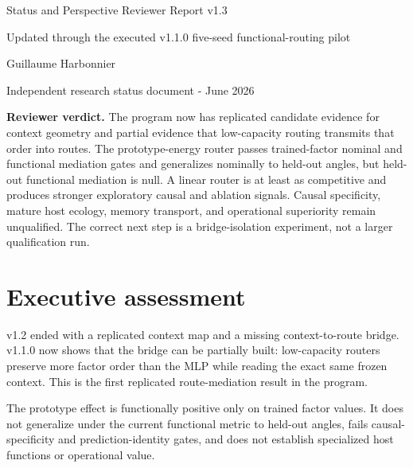 \documentclass[11pt,a4paper]{article}
\begin{document}
\begin{titlepage}\centering
{}\vspace{.2cm}
{\LARGE Status and Perspective Reviewer Report v1.3\par}\vspace{.35cm}
{\Large Updated through the executed v1.1.0 five-seed functional-routing pilot\par}\vspace{.8cm}
{\Large Guillaume Harbonnier\par}\vspace{.2cm}
{\normalsize Independent research status document - June 2026\par}
\vfill
\begin{minipage}{.92\textwidth}\small
\textbf{Reviewer verdict.} The program now has replicated candidate evidence for context geometry and partial evidence that low-capacity routing transmits that order into routes. The prototype-energy router passes trained-factor nominal and functional mediation gates and generalizes nominally to held-out angles, but held-out functional mediation is null. A linear router is at least as competitive and produces stronger exploratory causal and ablation signals. Causal specificity, mature host ecology, memory transport, and operational superiority remain unqualified. The correct next step is a bridge-isolation experiment, not a larger qualification run.
\end{minipage}\vfill
\end{titlepage}
\tableofcontents\clearpage

\section{Executive assessment}
\begin{positivebox}
v1.2 ended with a replicated context map and a missing context-to-route bridge. v1.1.0 now shows that the bridge can be partially built: low-capacity routers preserve more factor order than the MLP while reading the exact same frozen context. This is the first replicated route-mediation result in the program.
\end{positivebox}

\begin{warningbox}
The prototype effect is functionally positive only on trained factor values. It does not generalize under the current functional metric to held-out angles, fails causal-specificity and prediction-identity gates, and does not establish specialized host functions or operational value.
\end{warningbox}
\end{document}
